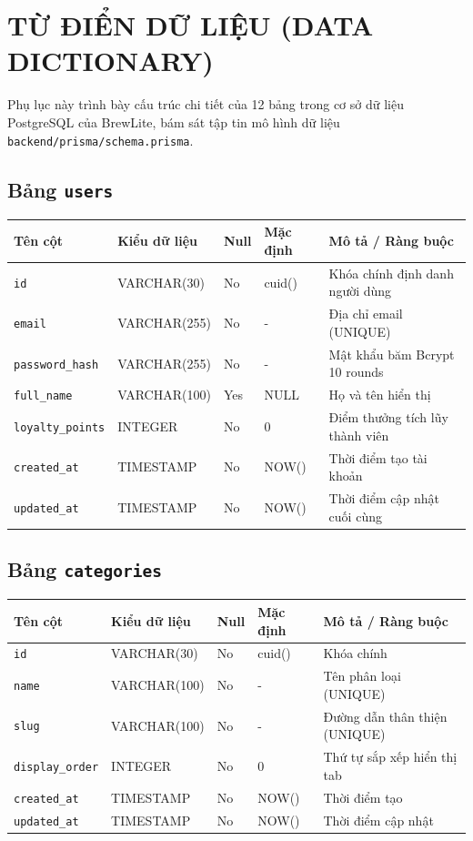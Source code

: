 \chapter{TỪ ĐIỂN DỮ LIỆU (DATA DICTIONARY)}
\label{app:data-dictionary}

Phụ lục này trình bày cấu trúc chi tiết của 12 bảng trong cơ sở dữ liệu PostgreSQL của BrewLite, bám sát tập tin mô hình dữ liệu \texttt{backend/prisma/schema.prisma}.

\section{Bảng \texttt{users}}
\begin{table}[htbp]
\centering
\small
\begin{tabularx}{\textwidth}{llllX}
\toprule
\textbf{Tên cột} & \textbf{Kiểu dữ liệu} & \textbf{Null} & \textbf{Mặc định} & \textbf{Mô tả / Ràng buộc} \\
\midrule
\texttt{id} & VARCHAR(30) & No & cuid() & Khóa chính định danh người dùng \\
\texttt{email} & VARCHAR(255) & No & - & Địa chỉ email (UNIQUE) \\
\texttt{password\_hash} & VARCHAR(255) & No & - & Mật khẩu băm Bcrypt 10 rounds \\
\texttt{full\_name} & VARCHAR(100) & Yes & NULL & Họ và tên hiển thị \\
\texttt{loyalty\_points} & INTEGER & No & 0 & Điểm thưởng tích lũy thành viên \\
\texttt{created\_at} & TIMESTAMP & No & NOW() & Thời điểm tạo tài khoản \\
\texttt{updated\_at} & TIMESTAMP & No & NOW() & Thời điểm cập nhật cuối cùng \\
\bottomrule
\end{tabularx}
\end{table}

\section{Bảng \texttt{categories}}
\begin{table}[htbp]
\centering
\small
\begin{tabularx}{\textwidth}{llllX}
\toprule
\textbf{Tên cột} & \textbf{Kiểu dữ liệu} & \textbf{Null} & \textbf{Mặc định} & \textbf{Mô tả / Ràng buộc} \\
\midrule
\texttt{id} & VARCHAR(30) & No & cuid() & Khóa chính \\
\texttt{name} & VARCHAR(100) & No & - & Tên phân loại (UNIQUE) \\
\texttt{slug} & VARCHAR(100) & No & - & Đường dẫn thân thiện (UNIQUE) \\
\texttt{display\_order} & INTEGER & No & 0 & Thứ tự sắp xếp hiển thị tab \\
\texttt{created\_at} & TIMESTAMP & No & NOW() & Thời điểm tạo \\
\texttt{updated\_at} & TIMESTAMP & No & NOW() & Thời điểm cập nhật \\
\bottomrule
\end{tabularx}
\end{table}

